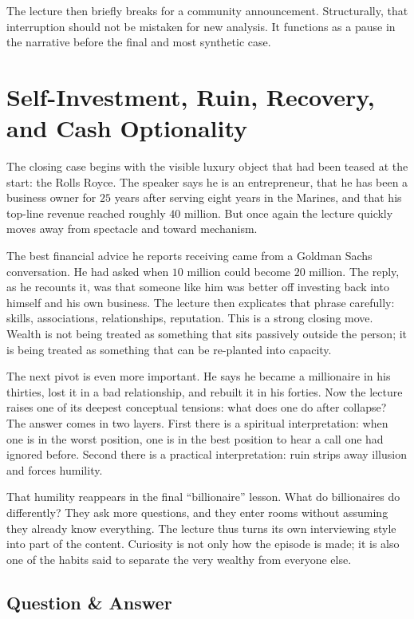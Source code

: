 The lecture then briefly breaks for a community announcement. Structurally, that interruption should not be mistaken for new analysis. It functions as a pause in the narrative before the final and most synthetic case.

\section{Self-Investment, Ruin, Recovery, and Cash Optionality}

The closing case begins with the visible luxury object that had been teased at the start: the Rolls Royce. The speaker says he is an entrepreneur, that he has been a business owner for \(25\) years after serving eight years in the Marines, and that his top-line revenue reached roughly \(40\) million. But once again the lecture quickly moves away from spectacle and toward mechanism.

The best financial advice he reports receiving came from a Goldman Sachs conversation. He had asked when \(10\) million could become \(20\) million. The reply, as he recounts it, was that someone like him was better off investing back into himself and his own business. The lecture then explicates that phrase carefully: skills, associations, relationships, reputation. This is a strong closing move. Wealth is not being treated as something that sits passively outside the person; it is being treated as something that can be re-planted into capacity.

The next pivot is even more important. He says he became a millionaire in his thirties, lost it in a bad relationship, and rebuilt it in his forties. Now the lecture raises one of its deepest conceptual tensions: what does one do after collapse? The answer comes in two layers. First there is a spiritual interpretation: when one is in the worst position, one is in the best position to hear a call one had ignored before. Second there is a practical interpretation: ruin strips away illusion and forces humility.

That humility reappears in the final ``billionaire'' lesson. What do billionaires do differently? They ask more questions, and they enter rooms without assuming they already know everything. The lecture thus turns its own interviewing style into part of the content. Curiosity is not only how the episode is made; it is also one of the habits said to separate the very wealthy from everyone else.

\subsection{Question \& Answer}

